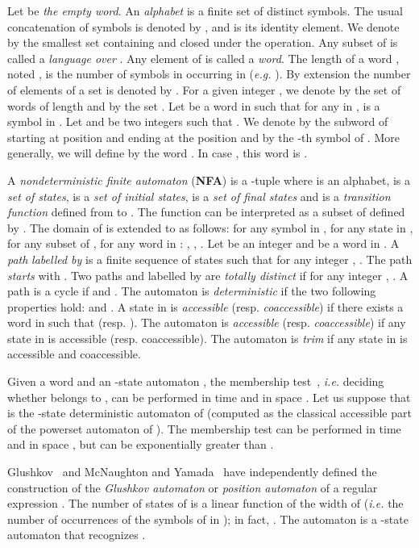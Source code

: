 \documentclass[11pt]{elsarticle}
\newcommand\modif[2]{{#2}}
\begin{document}
Let  be \emph{the empty word}. An \emph{alphabet}  is a finite set of distinct symbols. The usual concatenation of symbols is denoted by , and  is its identity element. We denote by  the smallest set containing  and closed under  the  operation. Any subset of  is called a \emph{language over} . Any element of  is called a \emph{word}. The length of a word , noted , is the number of symbols in  \modif{it is the concatenation of}{occurring in }  (\emph{e.g.} ). By extension the number of elements of a set  is denoted by .
For a given integer , we denote by  the set of words of length  and by  the set . 
 Let  be a word in  such that for any  in ,  is a symbol in . 
Let  and  be two integers such that . We denote by  the subword  of  starting at position  and ending at the position  and by  the -th symbol  of .
More generally, we will define by  the word .  In case , this word is .


A \emph{nondeterministic finite automaton} (\textbf{NFA})  is a -tuple  where  is an alphabet,  is a \emph{set of states},  is a \emph{set of initial states},  is a \emph{set of final states} and  is a \emph{transition function} defined from  to . The function  can be interpreted as a subset of  defined by   .
 The domain of  is extended to  as follows: for any symbol  in , for any state  in , for any subset  of , for any word  in : , , . 
  Let   be an integer and  be a word in . A \emph{path}  \emph{labelled by}  is a finite sequence \modif{}{ of states} such that for any integer , . The path  \emph{starts} with . Two paths  and  labelled by  are \emph{totally distinct} if for any integer , .
  A path  is a cycle if  and .  
The automaton  is  \emph{deterministic} if the two following properties hold:  and .
A state  in  is  \emph{accessible} (resp. \emph{coaccessible}) if there exists a word  in  such that  (resp. ). The automaton  is \emph{accessible} (resp. \emph{coaccessible})  if any state in  is accessible (resp. coaccessible). The automaton is \emph{trim} if any state in  is accessible and coaccessible.


Given a word  and an -state automaton , the membership test~\cite{HMU07}, \emph{i.e.} deciding whether  belongs to , can be performed in time  and in space . Let us suppose that  is the  -state deterministic automaton of  (computed as the classical accessible part of the powerset automaton of ). The membership test can be performed in time  and in space , but  can be exponentially greater than .

Glushkov~\cite{Glu61} and McNaughton and Yamada~\cite{MY60} have independently defined the construction of the \emph{Glushkov automaton} or \emph{position automaton}  of a 
regular expression . The number of states  of  is a linear function of the width \modif{}{} of  (\emph{i.e.} the number of occurrences of the symbols of  in ); in fact, \modif{}{}.
The automaton  is a 
-state  automaton that recognizes .
\end{document}
